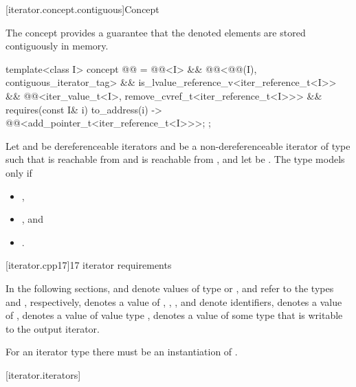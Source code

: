 [iterator.concept.contiguous]{Concept }

\pnum
The  concept provides a guarantee that
the denoted elements are stored contiguously in memory.

\begin{codeblock}
template<class I>
  concept @@ =
    @@<I> &&
    @@<@@(I), contiguous_iterator_tag> &&
    is_lvalue_reference_v<iter_reference_t<I>> &&
    @@<iter_value_t<I>, remove_cvref_t<iter_reference_t<I>>> &&
    requires(const I& i) {
      { to_address(i) } -> @@<add_pointer_t<iter_reference_t<I>>>;
    };
\end{codeblock}

\pnum
Let  and  be dereferenceable iterators and
 be a non-dereferenceable iterator of type 
such that  is reachable from  and
 is reachable from ,
and let  be .
The type  models  only if
\begin{itemize}
\item {},
\item {}, and
\item {}.
\end{itemize}

[iterator.cpp17]{\Cpp{}17 iterator requirements}

\pnum
In the following sections,
and
denote values of type
 or ,
 and  refer to the
types  and
, respectively,
denotes a value of
,
,
,
and
denote identifiers,
denotes a value of
,
denotes a value of value type
,
denotes a value of some type that is writable to the output iterator.
\begin{note}
For an iterator type  there must be an instantiation
of .
\end{note}

[iterator.iterators]{}

